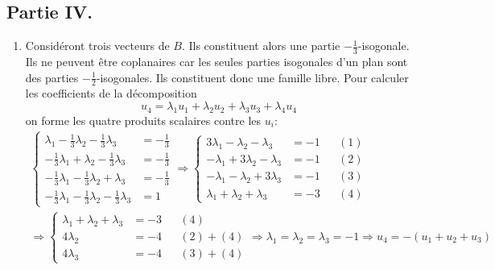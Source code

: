 \subsection*{Partie IV.}
\begin{enumerate}
\item Considéront trois vecteurs de $B$. Ils constituent alors une partie $-\frac{1}{3}$-isogonale. Ils ne peuvent être coplanaires car les seules parties isogonales d'un plan sont des parties $-\frac{1}{2}$-isogonales. Ils constituent donc une famille libre. \newline
Pour calculer les coefficients de la décomposition
\begin{displaymath}
 u_4 = \lambda_1 u_1+\lambda_2 u_2+\lambda_3 u_3+\lambda_4 u_4
\end{displaymath}
on forme les quatre produits scalaires contre les $u_i$:
\begin{multline*}
 \left\lbrace 
\begin{aligned}
 \lambda_1-\frac{1}{3}\lambda_2-\frac{1}{3}\lambda_3 &=-\frac{1}{3}\\
 -\frac{1}{3}\lambda_1+\lambda_2-\frac{1}{3}\lambda_3  &=-\frac{1}{3}\\
-\frac{1}{3}\lambda_1-\frac{1}{3}\lambda_2+\lambda_3  &=-\frac{1}{3}\\
-\frac{1}{3}\lambda_1-\frac{1}{3}\lambda_2-\frac{1}{3}\lambda_3  &= 1
\end{aligned}
\right. 
\Rightarrow
\left\lbrace 
\begin{aligned}
3\lambda_1-\lambda_2-\lambda_3 &= -1 & &(1)\\ 
-\lambda_1+3\lambda_2-\lambda_3 &= -1 & &(2)\\
-\lambda_1-\lambda_2+3\lambda_3 &= -1 & &(3)\\
\lambda_1+\lambda_2+\lambda_3 &= -3 & &(4)
\end{aligned}
\right. \\
\Rightarrow
\left\lbrace 
\begin{aligned}
 \lambda_1+\lambda_2+\lambda_3 &= -3 & &(4)\\
4\lambda_2 &= -4 & & (2)+(4) \\
4\lambda_3 &= -4 & & (3)+(4)
\end{aligned}
\right. 
\Rightarrow \lambda_1=\lambda_2=\lambda_3=-1
\Rightarrow u_4= -(u_1+u_2+u_3)
\end{multline*}
 

\end{enumerate}
